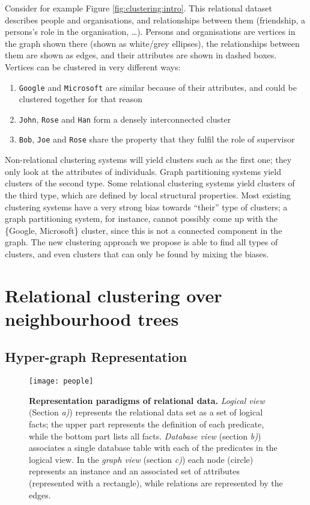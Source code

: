 Consider for example Figure \ref{fig:clustering:intro}.
This relational dataset describes people and organisations, and relationships between them (friendship, a persons’s role in the organisation, \ldots).
Persons and organisations are vertices in the graph shown there (shown as white/grey ellipses), the relationships between them are shown as edges, and their attributes are shown in dashed boxes.
Vertices can be clustered in very different ways:
\begin{enumerate}
    \item \texttt{Google} and \texttt{Microsoft} are similar because of their attributes, and could be clustered together for that reason
    \item \texttt{John}, \texttt{Rose} and \texttt{Han} form a densely interconnected cluster
    \item \texttt{Bob}, \texttt{Joe} and \texttt{Rose} share the property that they fulfil the role of supervisor
\end{enumerate}
Non-relational clustering systems will yield clusters such as the first one; they only look at the attributes of individuals.
Graph partitioning systems yield clusters of the second type.
Some relational clustering systems yield clusters of the third type, which are defined by local structural properties.
Most existing clustering systems have a very strong bias towards ``their'' type of clusters; a graph partitioning system, for instance, cannot possibly come up with the \{Google, Microsoft\} cluster, since this is not a connected component in the graph.
The new clustering approach we propose is able to find all types of clusters, and even clusters that can only be found by mixing the biases.








\section{Relational clustering over neighbourhood trees}
\label{sec:Approach}



\subsection{Hyper-graph Representation}

\begin{figure}
  \centering
  \medskip
  \texttt{[image: people]}
  \caption[Representation paradigms of relational data]{\textbf{Representation paradigms of relational data.} \textit{Logical view} (Section \textit{a)}) represents the relational data set as a set of logical facts; the upper part represents the definition of each predicate, while the bottom part lists all facts. \textit{Database view} (section \textit{b)}) associates a single database table with each of the predicates in the logical view. In the \textit{graph view} (section \textit{c)}) each node (circle) represents an instance and an associated set of attributes (represented with a rectangle), while relations are represented by the edges.}
  \label{fig:clustering:people}
\end{figure}

